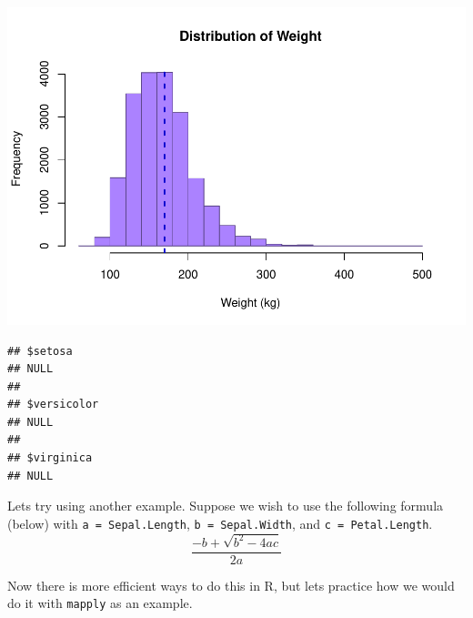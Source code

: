 \documentclass[
]{book}
\newenvironment{Shaded}{\begin{snugshade}}{\end{snugshade}}
\newcommand{\ControlFlowTok}[1]{\textcolor[rgb]{0.13,0.29,0.53}{\textbf{#1}}}
\newcommand{\DataTypeTok}[1]{\textcolor[rgb]{0.13,0.29,0.53}{#1}}
\newcommand{\DecValTok}[1]{\textcolor[rgb]{0.00,0.00,0.81}{#1}}
\newcommand{\KeywordTok}[1]{\textcolor[rgb]{0.13,0.29,0.53}{\textbf{#1}}}
\newcommand{\NormalTok}[1]{#1}
\newcommand{\OperatorTok}[1]{\textcolor[rgb]{0.81,0.36,0.00}{\textbf{#1}}}
\newcommand{\StringTok}[1]{\textcolor[rgb]{0.31,0.60,0.02}{#1}}
\begin{document}
\includegraphics{_main_files/figure-latex/unnamed-chunk-186-1.pdf}

\begin{verbatim}
## $setosa
## NULL
## 
## $versicolor
## NULL
## 
## $virginica
## NULL
\end{verbatim}

Lets try using another example. Suppose we wish to use the following formula (below) with \texttt{a\ =\ Sepal.Length}, \texttt{b\ =\ Sepal.Width}, and \texttt{c\ =\ Petal.Length}.
\[ \frac{-b + \sqrt{b^2-4ac} }{2a}\]

Now there is more efficient ways to do this in R, but lets practice how we would do it with \texttt{mapply} as an example.

\begin{Shaded}
\end{Shaded}
\end{document}
